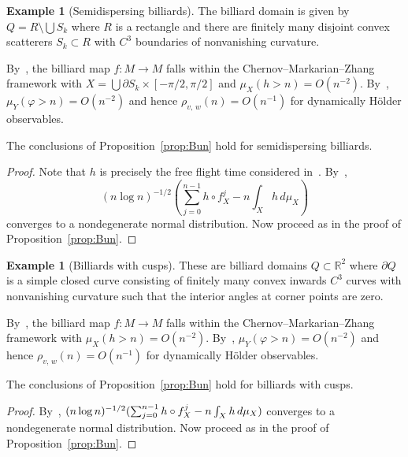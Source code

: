 \documentclass[10pt]{amsart}
\theoremstyle{definition}\newtheorem{defi}[theo]{Definition}\newtheorem{rema}[theo]{Remark}\newtheorem{exam}[theo]{Example}\newtheorem{exem}[theo]{Example}\newtheorem{nota}[theo]{Notation}
\newcommand{\R}{\mathbb{R}}
\begin{document}
\begin{exam}[Semidispersing billiards]\label{ex:semi}
The billiard domain is given by\linebreak$Q=R\setminus\bigcup S_k$ where $R$ is a rectangle and there are finitely many disjoint convex scatterers $S_k\subset R$ with $C^3$ boundaries of nonvanishing curvature.

By~\cite[Theorem~1]{ChernovZhang05}, the billiard map $f:M\to M$ falls within the Chernov--Markarian--Zhang framework with $X=\bigcup\partial S_k\times[-\pi/2,\pi/2]$ and $\mu_X(h>n)=O(n^{-2})$. By~\cite[Theorem~1.1]{ChernovZhang08}, $\mu_Y(\varphi>n)=O(n^{-2})$ and hence $\rho_{v,\,w}(n)=O(n^{-1})$ for dynamically H\"older observables.
\end{exam}



\begin{prop}\label{prop:semi}
The conclusions of Proposition~\ref{prop:Bun} hold for semidispersing billiards.
\end{prop}

\begin{proof}
Note that $h$ is precisely the free flight time considered in~\cite{Bleher92,SzaszVarju07}. By~\cite[Theorem~1]{SzaszVarju07},
\[
(n\log n)^{-1/2}\left(\sum_{j=0}^{n-1}h\circ f_X^j-n\int_X h\,d\mu_X\right)
\]
converges to a nondegenerate normal distribution. Now proceed as in the proof of Proposition~\ref{prop:Bun}.
\end{proof}

\begin{exam}[Billiards with cusps]
These are billiard domains $Q\subset\R^2$ where $\partial Q$ is a simple closed curve consisting of finitely many convex inwards $C^3$ curves with nonvanishing curvature such that the interior angles at corner points are zero.

By~\cite[Theorem~1.1]{ChernovMarkarian07}, the billiard map $f:M\to M$ falls within the Chernov--Markarian--Zhang framework with $\mu_X(h>n)=O(n^{-2})$. By~\cite[Theorem~1.1]{ChernovZhang08}, $\mu_Y(\varphi>n)=O(n^{-2})$ and hence $\rho_{v,\,w}(n)=O(n^{-1})$ for dynamically H\"older observables.
\end{exam}

\begin{prop}\label{prop:cusp}
The conclusions of Proposition~\ref{prop:Bun} hold for billiards with cusps.
\end{prop}

\begin{proof}
By~\cite[Theorem~4 and Equation~(2.5)]{BalintChernovDolgopyat11}, $(n\log n)^{-1/2}(\sum_{j=0}^{n-1}h\circ f_X^j\linebreak-n\int_X h\,d\mu_X)$ converges to a nondegenerate normal distribution. Now proceed as in the proof of Proposition~\ref{prop:Bun}.
\end{proof}
\end{document}
